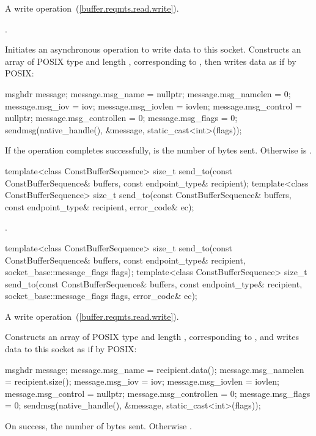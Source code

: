 \begin{itemdescr}
\pnum
A write operation~(\ref{buffer.reqmts.read.write}).

\pnum
\completionsig {}.

\pnum
\effects Initiates an asynchronous operation to write data to this socket. Constructs an array  of POSIX type  and length , corresponding to , then writes data as if by POSIX: 
\begin{codeblock}
msghdr message;
message.msg_name = nullptr;
message.msg_namelen = 0;
message.msg_iov = iov;
message.msg_iovlen = iovlen;
message.msg_control = nullptr;
message.msg_controllen = 0;
message.msg_flags = 0;
sendmsg(native_handle(), &message, static_cast<int>(flags));
\end{codeblock}


\pnum
If the operation completes successfully,  is the number of bytes sent. Otherwise  is .
\end{itemdescr}

\begin{itemdecl}
template<class ConstBufferSequence>
  size_t send_to(const ConstBufferSequence& buffers,
                 const endpoint_type& recipient);
template<class ConstBufferSequence>
  size_t send_to(const ConstBufferSequence& buffers,
                 const endpoint_type& recipient, error_code& ec);
\end{itemdecl}

\begin{itemdescr}
\pnum
\returns {}.
\end{itemdescr}

\begin{itemdecl}
template<class ConstBufferSequence>
  size_t send_to(const ConstBufferSequence& buffers,
                 const endpoint_type& recipient,
                 socket_base::message_flags flags);
template<class ConstBufferSequence>
  size_t send_to(const ConstBufferSequence& buffers,
                 const endpoint_type& recipient,
                 socket_base::message_flags flags, error_code& ec);
\end{itemdecl}

\begin{itemdescr}
\pnum
A write operation~(\ref{buffer.reqmts.read.write}).

\pnum
\effects Constructs an array  of POSIX type  and length , corresponding to , and writes data to this socket as if by POSIX: 
\begin{codeblock}
msghdr message;
message.msg_name = recipient.data();
message.msg_namelen = recipient.size();
message.msg_iov = iov;
message.msg_iovlen = iovlen;
message.msg_control = nullptr;
message.msg_controllen = 0;
message.msg_flags = 0;
sendmsg(native_handle(), &message, static_cast<int>(flags));
\end{codeblock}


\pnum
\returns On success, the number of bytes sent. Otherwise .
\end{itemdescr}

